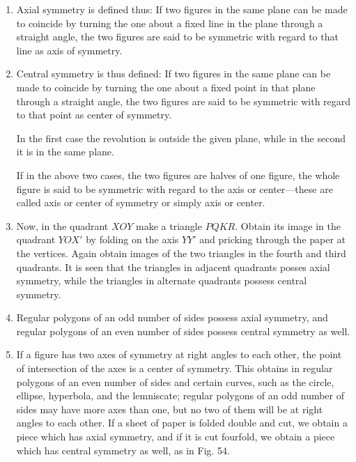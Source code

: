 \begin{enumerate}
\item Axial symmetry is defined thus: If two figures in the same plane can be
    made to coincide by turning the one about a fixed line in the plane through
    a straight angle, the two figures are said to be symmetric with regard to
    that line as axis of symmetry.


\item Central symmetry is thus defined: If two figures in the same plane can be
    made to coincide by turning the one about a fixed point in that plane
    through a straight angle, the two figures are said to be symmetric with
    regard to that point as center of symmetry.

    In the first case the revolution is outside the given plane, while in the
    second it is in the same plane.

    If in the above two cases, the two figures are halves of one figure, the
    whole figure is said to be symmetric with regard to the axis or center—these
    are called axis or center of symmetry or simply axis or center.



\item Now, in the quadrant $XOY$ make a triangle $PQKR$. Obtain its image in the
    quadrant $YOX'$ by folding on the axis $YY'$ and pricking through the paper 
    at the vertices. Again obtain images of the two triangles in the fourth and
    third quadrants. It is seen that the triangles in adjacent quadrants posses
    axial symmetry, while the triangles in alternate quadrants possess central 
    symmetry.

%

\item Regular polygons of an odd number of sides possess axial symmetry, and
    regular polygons of an even number of sides possess central symmetry as
    well.


\item If a figure has two axes of symmetry at right angles to each other, the
    point of intersection of the axes is a center of symmetry.  This obtains in
    regular polygons of an even number of sides and certain curves, such as the
    circle, ellipse, hyperbola, and the lemniscate; regular polygons of an odd
    number of sides may have more axes than one, but no two of them will be at
    right angles to each other.  If a sheet of paper is folded double and cut, 
    we obtain a piece which has axial symmetry, and if it is cut fourfold, we
    obtain a piece which has central symmetry as well, as in Fig. 54.


\end{enumerate}
